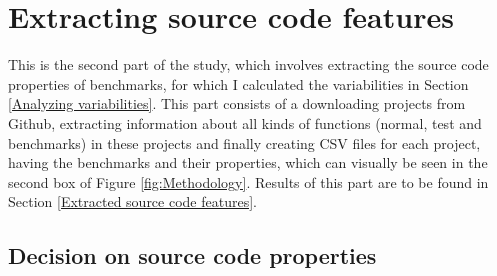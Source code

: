 \documentclass{seal_thesis}
\begin{document}
\section{Extracting source code features}

This is the second part of the study, which involves extracting the source code properties of benchmarks, for which I calculated the variabilities in Section \ref{Analyzing variabilities}. This part consists of a downloading projects from Github, extracting information about all kinds of functions (normal, test and benchmarks) in these projects and finally creating CSV files for each project, having the benchmarks and their properties, which can visually be seen in the second box of Figure \ref{fig:Methodology}. Results of this part are to be found in Section \ref{Extracted source code features}.

\subsection{Decision on source code properties}
\end{document}
